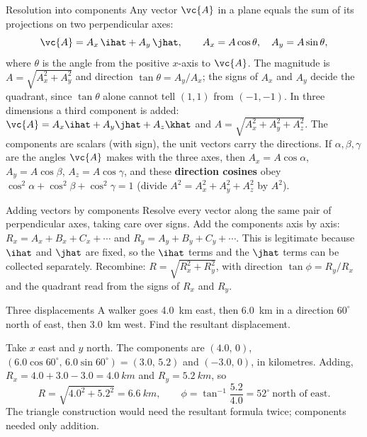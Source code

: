 \begin{defbox}{Resolution into components}
Any vector $\vc{A}$ in a plane equals the sum of its projections on two perpendicular axes:
\[
\vc{A} = A_x\,\ihat + A_y\,\jhat,\qquad A_x=A\cos\theta,\quad A_y=A\sin\theta,
\]
where $\theta$ is the angle from the positive $x$-axis to $\vc{A}$.
The magnitude is $A=\sqrt{A_x^2+A_y^2}$ and direction $\tan\theta=A_y/A_x$; the signs of $A_x$ and $A_y$
decide the quadrant, since $\tan\theta$ alone cannot tell $(1,1)$ from $(-1,-1)$. In three dimensions a
third component is added: $\vc{A}=A_x\ihat+A_y\jhat+A_z\khat$ and $A=\sqrt{A_x^2+A_y^2+A_z^2}$. The
components are scalars (with sign), the unit vectors carry the directions. If $\alpha,\beta,\gamma$ are
the angles $\vc{A}$ makes with the three axes, then $A_x=A\cos\alpha$, $A_y=A\cos\beta$, $A_z=A\cos\gamma$,
and these \textbf{direction cosines} obey $\cos^2\alpha+\cos^2\beta+\cos^2\gamma=1$ (divide
$A^2=A_x^2+A_y^2+A_z^2$ by $A^2$).
\end{defbox}

\begin{methodbox}{Adding vectors by components}
 Resolve every vector along the same pair of perpendicular axes, taking care over signs.
 Add the components axis by axis: $R_x=A_x+B_x+C_x+\cdots$ and $R_y=A_y+B_y+C_y+\cdots$. This
is legitimate because $\ihat$ and $\jhat$ are fixed, so the $\ihat$ terms and the $\jhat$ terms can be
collected separately.
 Recombine: $R=\sqrt{R_x^2+R_y^2}$, with direction $\tan\phi=R_y/R_x$ and the quadrant read
from the signs of $R_x$ and $R_y$.
\end{methodbox}

\begin{exbox}{Three displacements}
A walker goes \SI{4.0}{km} east, then \SI{6.0}{km} in a direction $60^\circ$ north of east, then
\SI{3.0}{km} west. Find the resultant displacement.

Take $x$ east and $y$ north. The components are $(4.0,\,0)$, $(6.0\cos60^\circ,\,6.0\sin60^\circ)=(3.0,\,5.2)$
and $(-3.0,\,0)$, in kilometres. Adding, $R_x=4.0+3.0-3.0=\SI{4.0}{km}$ and $R_y=\SI{5.2}{km}$, so
\[
R=\sqrt{4.0^2+5.2^2}=\SI{6.6}{km},\qquad \phi=\tan^{-1}\frac{5.2}{4.0}=52^\circ\ \text{north of east}.
\]
The triangle construction would need the resultant formula twice; components needed only addition.
\end{exbox}


